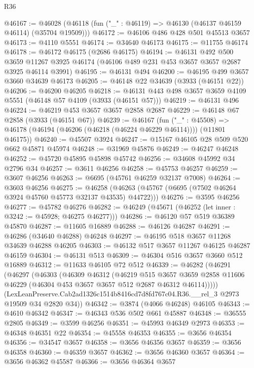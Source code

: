 \begin{lexlean}{R36}
\begin{coremodule}
@46167 := @46028 (@46118 (fun ("_" : @46119) => @46130 (@46137 @46159 @46114) (@35704 @19509)))
@46172 := @46106 @486 @428 @501 @45513 @3657
@46173 := @4110 @5551
@46174 := @34640 @46173
@46175 := @11755 @46174
@46178 := @46172 @46175 (@2686 @46175)
@46194 := @46131
    @492
    @500
    @3659
    @11267
    @3925
    @46174
    (@46106 @489 @231 @453 @3657 @3657 @2687 @3925 @46114 @3991)
@46195 := @46131 @494
@46200 := @46195 @499 @3657 @3660 @34639 @46173
@46205 := @46148 @22 @34639 (@3933 (@46151 @22))
@46206 := @46200 @46205
@46218 := @46131 @443 @498 @3657 @3659 @4109 @5551 (@46148 @57 @4109 (@3933 (@46151 @57)))
@46219 := @46131 @496
@46224 := @46219 @453 @3657 @3657 @2858 @2687
@46229 := @46148 @67 @2858 (@3933 (@46151 @67))
@46239 := @46167
    (fun ("_" : @45508) => @46178 (@46194 (@46206 (@46218 (@46224 @46229 @46114)))) (@11801 @46175))
@46240 := @45507 @3924
@46247 := @15167 @46105 @28 @509 @520 @662 @45871 @45974
@46248 := @31969 @45876
@46249 := @46247 @46248
@46252 := @45720 @45895 @45898 @45742
@46256 := @34608 @45992 @34 @2796 @34
@46257 := @3611 @46256
@46258 := @45753 @46257
@46259 := @3607 @46256
@46263 := @6695 (@45761 @46259 @32137 @7008)
@46264 := @3603 @46256
@46275 := @46258 (@46263 (@45767 (@6695 (@7502 @46264 @3924 @45760 @45773 @32137 @43535) @44722)))
@46276 := @3595 @46256
@46277 := @45782 @46276
@46282 := @46249 (@45671 (@46252 (let inner : @3242 := @45928; @46275 @46277)))
@46286 := @46120 @57 @519 @36389 @45870
@46287 := @11605 @16889
@46288 := @46126 @46287
@46291 := @46286 (@34640 @46288) @46248
@46297 := @46195 @518 @3657 @11268 @34639 @46288 @46205
@46303 := @46132 @517 @3657 @11267 @46125 @46287 @46159
@46304 := @46131 @513
@46309 := @46304 @516 @3657 @3660 @512 @16889
@46312 := @11633 @46105 @72 @512
@46339 := @46282
    (@46291
      (@46297
        (@46303
          (@46309
            @46312
            (@46219
              @515
              @3657
              @3659
              @2858
              @11606
              @46229
              (@46304 @453 @3657 @3657 @512 @2687 @46312 @46114)))))
      (LexLeanPreserve.Cab2ad1326c1514b8416cd7d8fd767c04.R36.__rel_3 @2973 @19509 @34 @2820 @34))
@46342 := @3874 (@4066 @46248) @46105
@46343 := @4610 @46342
@46347 := @46343 @536 @502 @661 @45887
@46348 := @36555 @2805
@46349 := @3599 @46256
@46351 := @45993 @46349 @2973
@46353 := @46348 @46351 @22
@46354 := @45558 @46353
@46355 := @3656 @46354
@46356 := @34547 @3657
@46358 := @3656 @46356 @3657
@46359 := @3656 @46358
@46360 := @46359 @3657
@46362 := @3656 @46360 @3657
@46364 := @3656 @46362 @45587
@46366 := @3656 @46364 @3657

\end{coremodule}
\end{lexlean}
